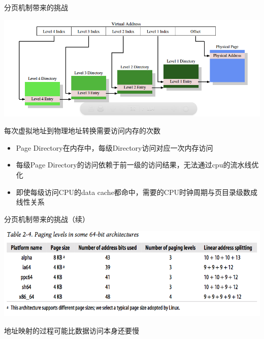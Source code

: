 \documentclass[handout]{beamer}
\begin{document}
\begin{CJK}{UTF8}{gbsn}
\begin{frame}{分页机制带来的挑战}
  \begin{block}{}
    \begin{center}
      \includegraphics[scale=0.22]{./images/page-table}
    \end{center}
    \pause
  \end{block}
  \begin{block}{每次虚拟地址到物理地址转换需要访问内存的次数}
    \begin{itemize}
      \item {Page Directory在内存中，每级Directory访问对应一次内存访问 \pause}
      \item {每级Page Directory的访问依赖于前一级的访问结果，无法通过cpu的流水线优化 \pause}
      \item {即使每级访问CPU的data cache都命中，需要的CPU时钟周期与页目录级数成线性关系}
    \end{itemize}
  \end{block}
\end{frame}

\begin{frame}{分页机制带来的挑战（续）}
  \begin{block}{}
    \begin{center}
      \includegraphics[scale=0.3]{./images/page-table-levels}
    \end{center}
    \pause
  \end{block}
  \begin{block}{地址映射的过程可能比数据访问本身还要慢}
  \end{block}
\end{frame}


\end{CJK}
\end{document}
